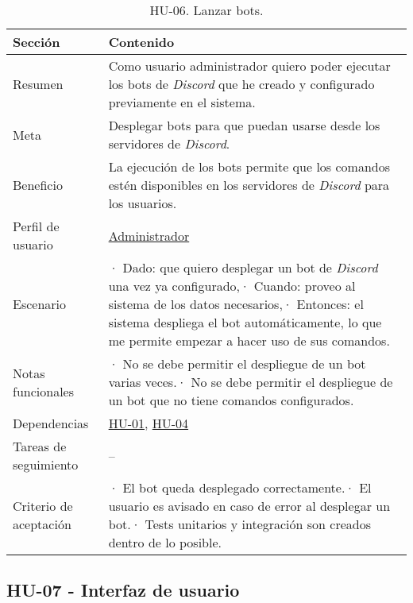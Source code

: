 \begin{table}[H]
    \centering
    \def\arraystretch{1.25}
    \begin{adjustbox}{max width=\textwidth}
    \begin{tabularx}{\textwidth}{|l|L|}
    \hline
        \textbf{Sección} & \textbf{Contenido} \\ \hline
    \hline
        Resumen & Como usuario administrador quiero poder ejecutar los bots de \textit{Discord} que he creado y configurado previamente en el sistema. \\ \hline
        Meta & Desplegar bots para que puedan usarse desde los servidores de \textit{Discord}. \\ \hline
        Beneficio & La ejecución de los bots permite que los comandos estén disponibles en los servidores de \textit{Discord} para los usuarios. \\ \hline
        Perfil de usuario & \hyperref[sec:personaAdmin]{Administrador} \\ \hline
        Escenario & · Dado: que quiero desplegar un bot de \textit{Discord} una vez ya configurado,\linebreak · Cuando: proveo al sistema de los datos necesarios,\linebreak · Entonces: el sistema despliega el bot automáticamente, lo que me permite empezar a hacer uso de sus comandos. \\ \hline
        Notas funcionales & · No se debe permitir el despliegue de un bot varias veces.\linebreak · No se debe permitir el despliegue de un bot que no tiene comandos configurados. \\ \hline
        Dependencias & \hyperref[sec:hu01]{HU-01}, \hyperref[sec:hu04]{HU-04} \\ \hline
        Tareas de seguimiento & – \\ \hline
        Criterio de aceptación & · El bot queda desplegado correctamente.\linebreak · El usuario es avisado en caso de error al desplegar un bot.\linebreak · Tests unitarios y integración son creados dentro de lo posible. \\ \hline
    \end{tabularx}
    \end{adjustbox}
    \caption{HU-06. Lanzar bots.}
\end{table}


\subsection{HU-07 - Interfaz de usuario}
\label{sec:hu07}

